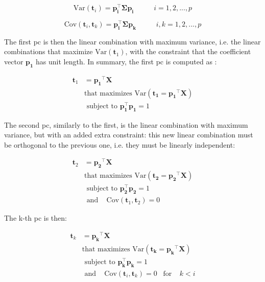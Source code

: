\begin{equation}
	\label{eqn:pca-var}
	\text{Var}(\mathbf{t}_i) = \mathbf{p_i^\intercal \Sigma p_i} \;\;\;\;\;\;\;\;\;\; i = 1, 2, ..., p
\end{equation}

\begin{equation}
	\label{eqn:pca-cov}
	\text{Cov}(\mathbf{t}_i, \mathbf{t}_k) = \mathbf{p_i^\intercal \Sigma p_k}\;\;\;\;\;\;\;\;\;\; i,k= 1, 2, ..., p
\end{equation}

The first \acrfull{pc} is then the linear combination with maximum variance, i.e. the linear combinations that maximize $\text{Var}(\mathbf{t}_1)$, with the constraint that the coefficient vector $\mathbf{p_1}$ has unit length. In summary, the first \acrshort{pc} is computed as \parencite{johnson2013applied}:

\begin{equation}
	\label{eqn:pca-pc1}
	\begin{split}
		\mathbf{t}_1 & =\mathbf{p_1}^\intercal \mathbf{X}\\
			   & \text{that maximizes Var}(\mathbf{t_1}=\mathbf{p_1}^\intercal \mathbf{X}) \\
			   & \text{ subject to }  \mathbf{p_1^\intercal p_1} = 1
	\end{split}
\end{equation}

The second \acrshort{pc}, similarly to the first, is the linear combination with maximum variance, but with an added extra constraint: this new linear combination must be orthogonal to the previous one, i.e. they must be linearly independent:

\begin{equation}
	\label{eqn:pca-pc2}
	\begin{split}
		\mathbf{t}_2 & =\mathbf{p_2}^\intercal \mathbf{X}\\
		& \text{that maximizes Var}(\mathbf{t_2}=\mathbf{p_2}^\intercal \mathbf{X}) \\
		& \text{ subject to }  \mathbf{p_2^\intercal p_2} = 1\\
		& \text{ and } \;\;\; \text{Cov}(\mathbf{t}_1, \mathbf{t}_2) = 0
	\end{split}
\end{equation}

The k-th \acrshort{pc} is then:

\begin{equation}
	\label{eqn:pca-pck}
	\begin{split}
		\mathbf{t}_k & =\mathbf{p_k}^\intercal \mathbf{X}\\
		& \text{that maximizes Var}(\mathbf{t_k}=\mathbf{p_k}^\intercal \mathbf{X}) \\
		& \text{ subject to }  \mathbf{p_k^\intercal p_k} = 1\\
		& \text{ and } \;\;\; \text{Cov}(\mathbf{t}_i, \mathbf{t}_k) = 0 \;\;\; \text{for} \;\;\;\; k<i
	\end{split}
\end{equation}

